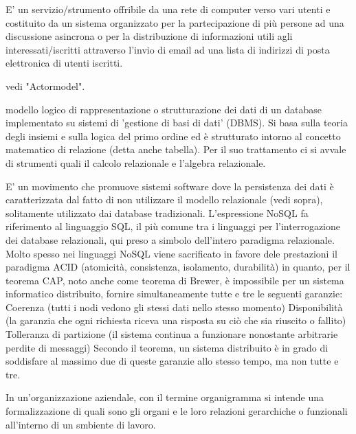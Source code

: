 \documentclass{scalatekids-article}
\begin{document}


 E' un servizio/strumento offribile da una rete di computer verso vari utenti e costituito da un sistema organizzato per la partecipazione di più persone ad una discussione asincrona o per la distribuzione di informazioni utili agli interessati/iscritti attraverso l'invio di email ad una lista di indirizzi di posta elettronica di utenti iscritti.

 vedi "Actormodel".

 modello logico di rappresentazione o strutturazione dei dati di un database implementato su sistemi di 'gestione di basi di dati' (DBMS).
Si basa sulla teoria degli insiemi e sulla logica del primo ordine ed è strutturato intorno al concetto matematico di relazione (detta anche tabella). Per il suo trattamento ci si avvale di strumenti quali il calcolo relazionale e l'algebra relazionale.


 E' un movimento che promuove sistemi software dove la persistenza dei dati è caratterizzata dal fatto di non utilizzare il modello relazionale (vedi sopra), solitamente utilizzato dai database tradizionali.
L'espressione NoSQL fa riferimento al linguaggio SQL, il più comune tra i linguaggi per l'interrogazione dei database relazionali, qui preso a simbolo dell'intero paradigma relazionale. Molto spesso nei linguaggi NoSQL viene sacrificato in favore dele prestazioni il paradigma ACID (atomicità, consistenza, isolamento, durabilità) in quanto, per il teorema CAP, noto anche come teorema di Brewer, è impossibile per un sistema informatico distribuito, fornire simultaneamente tutte e tre le seguenti garanzie:
Coerenza (tutti i nodi vedono gli stessi dati nello stesso momento)
Disponibilità (la garanzia che ogni richiesta riceva una risposta su ciò che sia riuscito o fallito)
Tolleranza di partizione (il sistema continua a funzionare nonostante arbitrarie perdite di messaggi)
Secondo il teorema, un sistema distribuito è in grado di soddisfare al massimo due di queste garanzie allo stesso tempo, ma non tutte e tre.


 In un'organizzazione aziendale, con il termine organigramma si intende una formalizzazione di quali sono gli organi e le loro relazioni gerarchiche o funzionali all'interno di un smbiente di lavoro.
\end{document}
